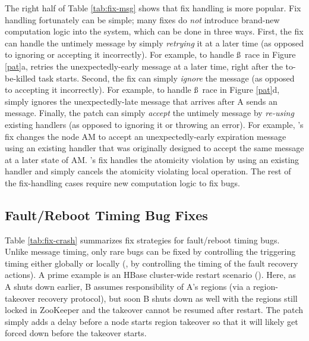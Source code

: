 The right half of Table \ref{tab:fix-msg} shows that fix handling is
more popular.  Fix handling fortunately can be simple;  many fixes
do {\em not} introduce brand-new computation logic into
the system, which can be done in three ways.
% 
First, the fix can handle the untimely message by simply {\em
  retrying} it at a later time (as opposed to ignoring or
accepting it incorrectly).  For example, to handle \mbc\ss\mac\ race
in Figure \ref{pat}a,  retries the unexpectedly-early
\mac{} message at a later time, right after the
to-be-killed task starts.
%
Second, the fix can simply {\em ignore} the message (as opposed
to accepting it incorrectly).  For example, to handle
\mab\ss\mba\ race in Figure \ref{pat}d,  simply ignores
the unexpectedly-late \mba{} message that arrives after
A sends an \mab{} message.
%
Finally, the patch can simply {\em accept} the untimely message
by {\em re-using} existing handlers (as opposed to ignoring it or throwing
an error).  For example, 's fix changes the node AM to accept
an unexpectedly-early expiration message using an existing
handler that was originally designed to accept the same message at a
later state of AM.  's fix handles the atomicity violation by
using an existing handler and simply cancels the atomicity violating
local operation.
%
The rest of the fix-handling cases require new computation
logic to fix bugs.




\subsection{Fault/Reboot Timing Bug Fixes}
\label{fix-crash}






Table \ref{tab:fix-crash} summarizes fix strategies for fault/reboot
timing bugs.  Unlike message timing, only rare bugs can be fixed by
controlling the triggering timing either globally or
locally (\eg, by controlling the timing of the fault recovery
actions).  A prime example is an HBase cluster-wide restart scenario
().  Here, as A shuts down earlier, B assumes responsibility
of A's regions (via a region-takeover recovery protocol), but soon B
shuts down as well with the regions still locked in ZooKeeper and the
takeover cannot be resumed after restart.  The patch simply adds a
delay before a node starts region takeover so that it will likely get
forced down before the takeover starts.

